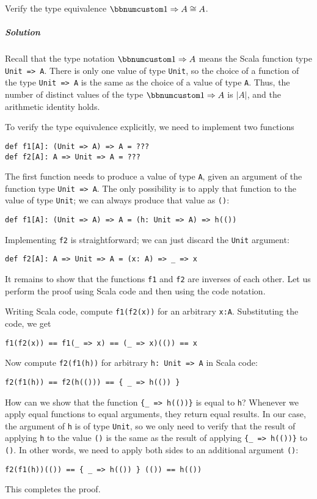 Verify the type equivalence $\bbnum 1\Rightarrow A\cong A$.

\subparagraph{Solution}

Recall that the type notation $\bbnum 1\Rightarrow A$ means the Scala
function type \lstinline!Unit => A!. There is only one value of type
\lstinline!Unit!, so the choice of a function of the type \lstinline!Unit => A!
is the same as the choice of a value of type \lstinline!A!. Thus,
the number of distinct values of the type $\bbnum 1\Rightarrow A$
is $\left|A\right|$, and the arithmetic identity holds.

To verify the type equivalence explicitly, we need to implement two
functions
\begin{lstlisting}
def f1[A]: (Unit => A) => A = ???
def f2[A]: A => Unit => A = ???
\end{lstlisting}
The first function needs to produce a value of type \lstinline!A!,
given an argument of the function type \lstinline!Unit => A!. The
only possibility is to apply that function to the value of type \lstinline!Unit!;
we can always produce that value as \lstinline!()!:
\begin{lstlisting}
def f1[A]: (Unit => A) => A = (h: Unit => A) => h(())
\end{lstlisting}
Implementing \lstinline!f2! is straightforward; we can just discard
the \lstinline!Unit! argument:
\begin{lstlisting}
def f2[A]: A => Unit => A = (x: A) => _ => x
\end{lstlisting}
It remains to show that the functions \lstinline!f1! and \lstinline!f2!
are inverses of each other. Let us perform the proof using Scala code
and then using the code notation.

Writing Scala code, compute \lstinline!f1(f2(x))! for an arbitrary
\lstinline!x:A!. Substituting the code, we get
\begin{lstlisting}
f1(f2(x)) == f1(_ => x) == (_ => x)(()) == x
\end{lstlisting}
Now compute \lstinline!f2(f1(h))! for arbitrary \lstinline!h: Unit => A!
in Scala code:
\begin{lstlisting}
f2(f1(h)) == f2(h(())) == { _ => h(()) }
\end{lstlisting}
How can we show that the function \lstinline!{_ => h(())}! is equal
to \lstinline!h!? Whenever we apply equal functions to equal arguments,
they return equal results. In our case, the argument of \lstinline!h!
is of type \lstinline!Unit!, so we only need to verify that the result
of applying \lstinline!h! to the value \lstinline!()! is the same
as the result of applying \lstinline!{_ => h(())}! to \lstinline!()!.
In other words, we need to apply both sides to an additional argument
\lstinline!()!:
\begin{lstlisting}
f2(f1(h))(()) == { _ => h(()) } (()) == h(())
\end{lstlisting}
This completes the proof.

